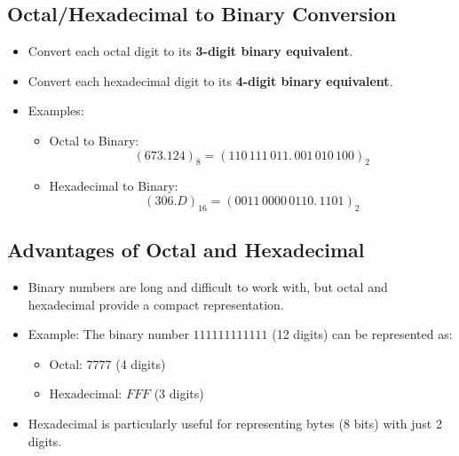 \documentclass[a4paper,12pt]{article}
\begin{document}
	\subsection*{Octal/Hexadecimal to Binary Conversion}
	\begin{itemize}
		\item Convert each octal digit to its \textbf{3-digit binary equivalent}.
		\item Convert each hexadecimal digit to its \textbf{4-digit binary equivalent}.
		\item Examples:
		\begin{itemize}
			\item Octal to Binary:
			\[
			(673.124)_8 = (110\,111\,011.\,001\,010\,100)_2
			\]
			\item Hexadecimal to Binary:
			\[
			(306.D)_{16} = (0011\,0000\,0110.\,1101)_2
			\]
		\end{itemize}
	\end{itemize}
	
	\subsection*{Advantages of Octal and Hexadecimal}
	\begin{itemize}
		\item Binary numbers are long and difficult to work with, but octal and hexadecimal provide a compact representation.
		\item Example: The binary number \(111111111111\) (12 digits) can be represented as:
		\begin{itemize}
			\item Octal: \(7777\) (4 digits)
			\item Hexadecimal: \(FFF\) (3 digits)
		\end{itemize}
		\item Hexadecimal is particularly useful for representing bytes (8 bits) with just 2 digits.
	\end{itemize}
	
\end{document}
